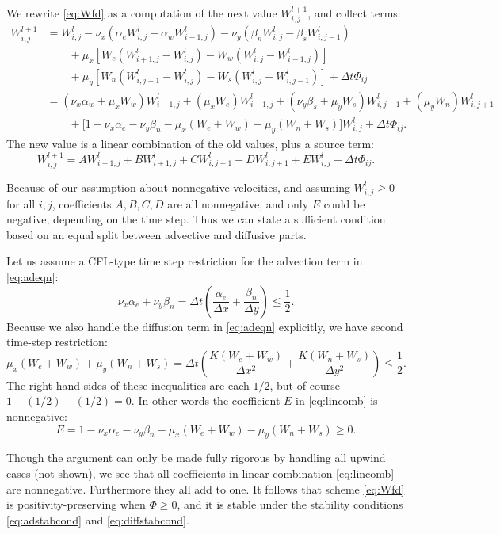 \documentclass[12pt,final]{amsart}%
\newcommand{\Wlij}{W^l_{i,j}}
\begin{document}
We rewrite \eqref{eq:Wfd} as a computation of the next value $W_{i,j}^{l+1}$, and collect terms:
\begin{align*}
 W_{i,j}^{l+1} &= \Wlij - \nu_x \left(\alpha_e \Wlij - \alpha_w W_{i-1,j}^l\right) - \nu_y \left(\beta_n \Wlij - \beta_s W_{i,j-1}^l\right)  \\
      &\qquad + \mu_x \left[W_e \left(W_{i+1,j}^l - \Wlij\right) - W_w \left(\Wlij - W_{i-1,j}^l\right)\right]  \\
      &\qquad + \mu_y \left[W_n \left(W_{i,j+1}^l - \Wlij\right) - W_s \left(\Wlij - W_{i,j-1}^l\right)\right] + \Delta t \Phi_{ij} \\
      &= (\nu_x \alpha_w + \mu_x W_w) W_{i-1,j}^l + (\mu_x W_e) W_{i+1,j}^l + (\nu_y \beta_s + \mu_y W_s) W_{i,j-1}^l + (\mu_y W_n) W_{i,j+1}^l \\
      &\qquad + \Big[1 - \nu_x \alpha_e - \nu_y \beta_n - \mu_x (W_e + W_w) - \mu_y (W_n + W_s)\Big] \Wlij + \Delta t \Phi_{ij}.
\end{align*}
The new value is a linear combination of the old values, plus a source term:
\begin{equation}
W_{i,j}^{l+1} = A W_{i-1,j}^l + B W_{i+1,j}^l + C W_{i,j-1}^l + D W_{i,j+1}^l + E \Wlij + \Delta t \Phi_{ij}. \label{eq:lincomb}
\end{equation}

Because of our assumption about nonnegative velocities, and assuming $\Wlij \ge 0$ for all $i,j$, coefficients $A,B,C,D$ are all nonnegative, and only $E$ could be negative, depending on the time step.  Thus we can state a sufficient condition based on an equal split between advective and diffusive parts.

Let us assume a CFL-type time step restriction for the advection term in  \eqref{eq:adeqn}:
\begin{equation}
\nu_x \alpha_e + \nu_y \beta_n = \Delta t \left(\frac{\alpha_e}{\Delta x} + \frac{\beta_n}{\Delta y}\right) \le \frac{1}{2}. \label{eq:adstabcond}
\end{equation}
Because we also handle the diffusion term in \eqref{eq:adeqn} explicitly, we have second time-step restriction:
\begin{equation}
\mu_x (W_e + W_w) + \mu_y (W_n + W_s) = \Delta t \left(\frac{K(W_e + W_w)}{\Delta x^2} + \frac{K(W_n + W_s)}{\Delta y^2}\right) \le \frac{1}{2}. \label{eq:diffstabcond}
\end{equation}
The right-hand sides of these inequalities are each $1/2$, but of course $1-(1/2)-(1/2)=0$.  In other words the coefficient $E$ in \eqref{eq:lincomb} is nonnegative:
	$$E = 1 - \nu_x \alpha_e - \nu_y \beta_n - \mu_x (W_e + W_w) - \mu_y (W_n + W_s) \ge 0.$$

Though the argument can only be made fully rigorous by handling all upwind cases (not shown), we see that all coefficients in linear combination \eqref{eq:lincomb} are nonnegative.  Furthermore they all add to one.  It follows \citep{MortonMayers} that scheme \eqref{eq:Wfd} is positivity-preserving when $\Phi\ge 0$, and it is stable under the stability conditions \eqref{eq:adstabcond} and \eqref{eq:diffstabcond}.
\end{document}
